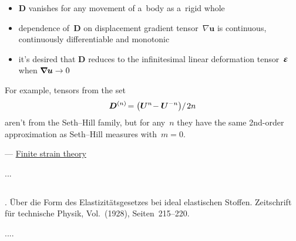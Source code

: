 \begin{itemize}
\item $\bm{D}$ vanishes for any movement of a~body as a~rigid whole
\item dependence of~$\bm{D}$ on displacement gradient tensor~${\nabla \bm{u}}$ is continuous, continuously differentiable and monotonic
\item it’s desired that $\bm{D}$ reduces to the infinitesimal linear deformation tensor~${\infinitesimaldeformation}$ when ${\bm{\nabla}\hspace{-0.2ex} \bm{u} \to 0}$
\end{itemize}

\noindent For example, tensors from the set
\[ \displaystyle \bm{D}^{(n)} \hspace{-0.32ex} = \left( {\bm{U}}^{n} \hspace{-0.4ex} - {\bm{U}}^{-n} \right) \hspace{-0.4ex} / \hspace{.25ex} 2n \]
aren’t from the Seth\hbox{--}Hill family, but for any~$n$ they have the same 2nd\hbox{-}order approximation as Seth\hbox{--}Hill measures with~${m=0}$.

\vspace{.4em} \noindent \hfill {}\:--- \href{https://en.wikipedia.org/wiki/Finite_strain_theory}{Finite strain theory}

...


\subsection*{}

\href{https://en.wikipedia.org/wiki/Heinrich_Hencky}{%
%
}.
Über die Form des Elastizitätsgesetzes bei ideal elastischen Stoffen.
Zeitschrift für technische Physik, Vol.~(1928),
Seiten~215\hbox{--}220.


....





\label{section:velocityfield}

